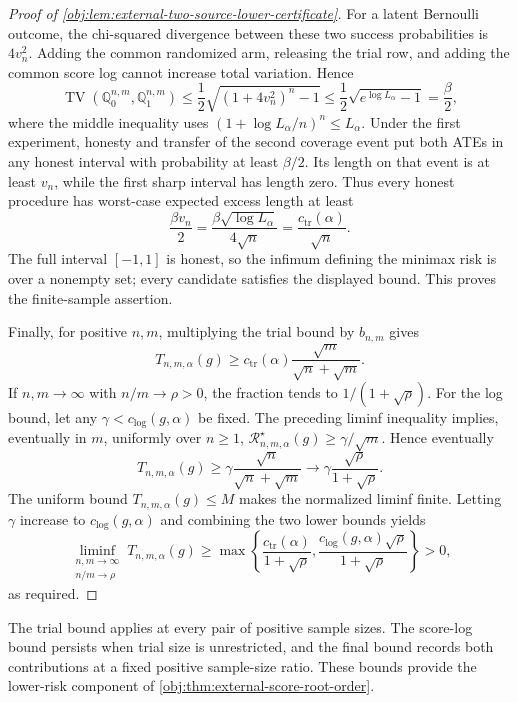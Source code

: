 \documentclass[11pt]{article}
\begin{document}
\begin{proof}[Proof of \cref{obj:lem:external-two-source-lower-certificate}]
For a latent Bernoulli outcome, the chi-squared divergence between these two success probabilities is \(4v_n^2\). Adding the common randomized arm, releasing the trial row, and adding the common score log cannot increase total variation. Hence
\[
\operatorname{TV}(\mathbb Q_0^{n,m},\mathbb Q_1^{n,m})
\le\frac12\sqrt{(1+4v_n^2)^n-1}
\le\frac12\sqrt{e^{\log L_\alpha}-1}
=\frac{\beta}{2},
\]
where the middle inequality uses
\((1+\log L_\alpha/n)^n\le L_\alpha\). Under the first experiment, honesty and transfer of the second coverage event put both ATEs in any honest interval with probability at least \(\beta/2\). Its length on that event is at least \(v_n\), while the first sharp interval has length zero. Thus every honest procedure has worst-case expected excess length at least
\[
\frac{\beta v_n}{2}
=\frac{\beta\sqrt{\log L_\alpha}}{4\sqrt n}
=\frac{c_{\mathrm{tr}}(\alpha)}{\sqrt n}.
\]
The full interval \([-1,1]\) is honest, so the infimum defining the minimax risk is over a nonempty set; every candidate satisfies the displayed bound. This proves the finite-sample assertion.

Finally, for positive \(n,m\), multiplying the trial bound by \(b_{n,m}\) gives
\[
T_{n,m,\alpha}(g)
\ge c_{\mathrm{tr}}(\alpha)
 \frac{\sqrt m}{\sqrt n+\sqrt m}.
\]
If \(n,m\to\infty\) with \(n/m\to\rho>0\), the fraction tends to
\(1/(1+\sqrt\rho)\). For the log bound, let any
\(\gamma<c_{\mathrm{log}}(g,\alpha)\) be fixed. The preceding liminf inequality implies, eventually in \(m\), uniformly over \(n\ge1\),
\(\mathcal R^\star_{n,m,\alpha}(g)\ge\gamma/\sqrt m\). Hence eventually
\[
T_{n,m,\alpha}(g)
\ge \gamma\frac{\sqrt n}{\sqrt n+\sqrt m}
\longrightarrow
\gamma\frac{\sqrt\rho}{1+\sqrt\rho}.
\]
The uniform bound \(T_{n,m,\alpha}(g)\le M\) makes the normalized liminf finite. Letting \(\gamma\) increase to \(c_{\mathrm{log}}(g,\alpha)\) and combining the two lower bounds yields
\[
\liminf_{\substack{n,m\to\infty\\ n/m\to\rho}}
T_{n,m,\alpha}(g)
\ge
\max\left\{
\frac{c_{\mathrm{tr}}(\alpha)}{1+\sqrt\rho},
\frac{c_{\mathrm{log}}(g,\alpha)\sqrt\rho}{1+\sqrt\rho}
\right\}>0,
\]
as required.
\end{proof}

The trial bound applies at every pair of positive sample sizes. The score-log bound persists when trial size is unrestricted, and the final bound records both contributions at a fixed positive sample-size ratio. These bounds provide the lower-risk component of \cref{obj:thm:external-score-root-order}.
\end{document}
